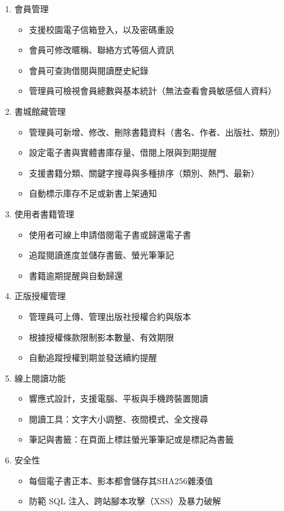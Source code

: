 \begin{enumerate}
    \item 會員管理
    \begin{itemize}
        \item 支援校園電子信箱登入，以及密碼重設
        \item 會員可修改暱稱、聯絡方式等個人資訊
        \item 會員可查詢借閱與閱讀歷史紀錄
        \item 管理員可檢視會員總數與基本統計（無法查看會員敏感個人資料）
    \end{itemize}

    \item 書城館藏管理
    \begin{itemize}
        \item 管理員可新增、修改、刪除書籍資料（書名、作者、出版社、類別）
        \item 設定電子書與實體書庫存量、借閱上限與到期提醒
        \item 支援書籍分類、關鍵字搜尋與多種排序（類別、熱門、最新）
        \item 自動標示庫存不足或新書上架通知
    \end{itemize}

    \item 使用者書籍管理
    \begin{itemize}
        \item 使用者可線上申請借閱電子書或歸還電子書
        \item 追蹤閱讀進度並儲存書籤、螢光筆筆記
        \item 書籍逾期提醒與自動歸還
    \end{itemize}

    \item 正版授權管理
    \begin{itemize}
        \item 管理員可上傳、管理出版社授權合約與版本
        \item 根據授權條款限制影本數量、有效期限
        \item 自動追蹤授權到期並發送續約提醒
    \end{itemize}

    \item 線上閱讀功能
    \begin{itemize}
        \item 響應式設計，支援電腦、平板與手機跨裝置閱讀
        \item 閱讀工具：文字大小調整、夜間模式、全文搜尋
        \item 筆記與書籤：在頁面上標註螢光筆筆記或是標記為書籤
    \end{itemize}

    \item 安全性
    \begin{itemize}
        \item 每個電子書正本、影本都會儲存其SHA256雜湊值
        \item 防範 SQL 注入、跨站腳本攻擊（XSS）及暴力破解
    \end{itemize}
\end{enumerate}

